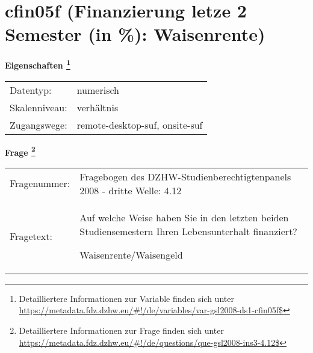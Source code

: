 
    \setcounter{footnote}{0}

    \vspace*{-1.8cm}
	\section{cfin05f (Finanzierung letze 2 Semester (in \%): Waisenrente)}
	\label{section:cfin05f}



    \vspace*{0.5cm}
    \noindent\textbf{Eigenschaften
	\footnote{Detailliertere Informationen zur Variable finden sich unter
		\url{https://metadata.fdz.dzhw.eu/\#!/de/variables/var-gsl2008-ds1-cfin05f$}}}\\
	\begin{tabularx}{\hsize}{@{}lX}
	Datentyp: & numerisch \\
	Skalenniveau: & verhältnis \\
	Zugangswege: &
	  remote-desktop-suf, 
	  onsite-suf
 \\
    \end{tabularx}



				\vspace*{0.5cm}
                \noindent\textbf{Frage
	                \footnote{Detailliertere Informationen zur Frage finden sich unter
		              \url{https://metadata.fdz.dzhw.eu/\#!/de/questions/que-gsl2008-ins3-4.12$}}}\\
				\begin{tabularx}{\hsize}{@{}lX}
					Fragenummer: &
					  Fragebogen des DZHW-Studienberechtigtenpanels 2008 - dritte Welle:
					  4.12
 \\
					Fragetext: & Auf welche Weise haben Sie in den letzten beiden Studiensemestern Ihren Lebensunterhalt finanziert?\par  Waisenrente/Waisengeld \\
				\end{tabularx}





